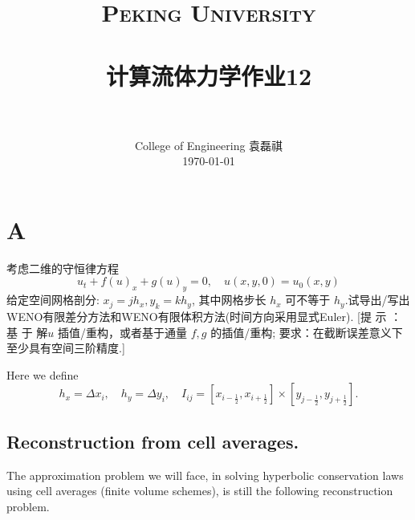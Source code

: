 \documentclass[12pt]{article}
\title{
		\vspace{-1in} 	
		\usefont{OT1}{bch}{b}{n}
		\normalfont \normalsize \textsc{\LARGE Peking University}\\[0.2cm] %
		\horrule{0.5pt} \\[0.2cm]
		\huge \bfseries{计算流体力学作业12} \\[-0.2cm]
		\horrule{2pt} \\[0.2cm]
}
\author{
		\normalfont 								\normalsize
		College of Engineering \quad 2001111690  \quad 袁磊祺\\	\normalsize
        \today
}
\date{}
\begin{document}
% 

\maketitle

\section{A}


考虑二维的守恒律方程
\begin{equation}
	u_{t}+f(u)_{x}+g(u)_{y}=0, \quad u(x, y, 0)=u_{0}(x, y)
	\label{eq:11}
\end{equation}
给定空间网格剖分: $x_{j}=j h_{x}, y_{k}=k h_{y}$, 其中网格步长 $h_{x}$ 可不等于 $h_{y} .$试导出/写出WENO有限差分方法和WENO有限体积方法(时间方向采用显式Euler). [提 示 ： 基 于 解$ u$ 插值/重构，或者基于通量 $f, g$ 的插值/重构; 要求：在截断误差意义下至少具有空间三阶精度.]


Here we define
\begin{equation}
	h_x = \Delta x_i, \quad h_y = \Delta y_i,\quad I_{ij} = [x_{i-\frac{1}{2}},x_{i+\frac{1}{2}}]\times [y_{j-\frac{1}{2}},y_{j+\frac{1}{2}}].
\end{equation}


\subsection{Reconstruction from cell averages.\cite{Shu1998}}

The approximation problem we will face, in solving hyperbolic conservation laws using cell averages (finite volume schemes), is still the following reconstruction problem.
\end{document}
